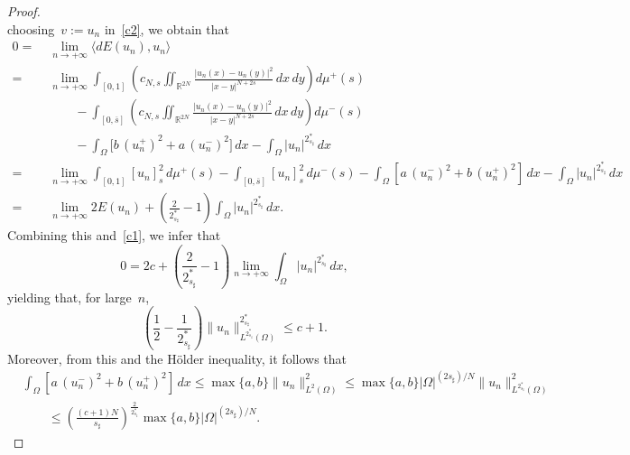 \documentclass[12pt,a4paper,intlimits,sumlimits]{amsart}
\def \R {\mathbb{R}}
\newcommand{\half}{\frac{1}{2}}
\theoremstyle{definition}
\theoremstyle{plain}
\numberwithin{equation}{section}
\renewcommand{\le}{\leqslant}
\begin{document}
\begin{proof}
\begin{equation*}
\end{equation*}
choosing~$v:=u_n$ in~\eqref{c2},
we obtain that
\begin{equation}\label{hufewghwutgui0987654}
\begin{split}0=\;& \lim_{n\to+\infty}
\langle dE (u_n), u_n\rangle\\=
\;& \lim_{n\to+\infty}\int_{[{{ 0 }}, 1]}\left(c_{N,s}
\iint_{\R^{2N}} \frac{|u_n(x) - u_n(y)|^2}{|x - y|^{N+2s}}\, dx\, dy\right) d\mu^+(s)\\
&\qquad- \int_{[{{ 0 }}, \overline s]}\left(c_{N,s}
\iint_{\R^{2N}} \frac{|u_n(x) - u_n(y)|^2}{|x - y|^{N+2s}}\, dx\, dy\right) d\mu^-(s)\\
&\qquad -\int_\Omega \big[b\, (u_n^+)^2 +a\, (u_n^-)^2\big]\, dx - \int_\Omega |u_n|^{2_{s_\sharp}^\ast}\, dx\\=\;&  \lim_{n\to+\infty}
\int_{[{{ 0 }}, 1]} [u_n]^2_{s}\, d\mu^+ (s) -\int_{[{{ 0 }}, \overline s]} [u_n]^2_s \, d\mu^-(s) - \int_\Omega \left[a\, (u_n^-)^2 + b\, (u_n^+)^2\right] \,dx - \int_\Omega |u_n|^{2_{s_\sharp}^*}\, dx
\\=\;&  \lim_{n\to+\infty} 2E(u_n)+\left(\frac2{2^*_{s_\sharp}}-1\right)\int_\Omega |u_n|^{2_{s_\sharp}^*}\, dx.
\end{split}
\end{equation}
Combining this and~\eqref{c1}, we infer that
\begin{equation}\label{jdewfguewogewuootr6u768i0}
0=2c+
\left(\frac2{2^*_{s_\sharp}}-1\right)\lim_{n\to+\infty}\int_\Omega |u_n|^{2_{s_\sharp}^*}\, dx,\end{equation}
yielding that, for large~$n$,
\begin{equation}\label{prima}
\left(\half -  \frac{1}{2_{s_\sharp}^*}\right) \|u_n\|^{2^*_{s_\sharp}}_{L^{2^*_{s_\sharp}}(\Omega)} \le c+1. 
\end{equation}
Moreover, from this and the H\"older inequality, it follows that
\begin{equation}\label{prima22}\begin{split}&
\int_\Omega \left[a\, (u_n^-)^2 + b\, (u_n^+)^2\right]\, dx \le \max\{ a, b\}\|u_n\|^2_{L^2(\Omega)} \le \max\{ a, b\} |\Omega|^{(2 s_\sharp)/N} \|u_n\|^2_{L^{2^*_{s_\sharp}}(\Omega)}\\
&\qquad\le \left(\frac{(c+1)N}{s_\sharp}\right)^{\frac2{2^*_{s_\sharp}}} \max\{ a, b\} |\Omega|^{(2 s_\sharp)/N}.
\end{split}\end{equation}


\end{proof}
\end{document}
